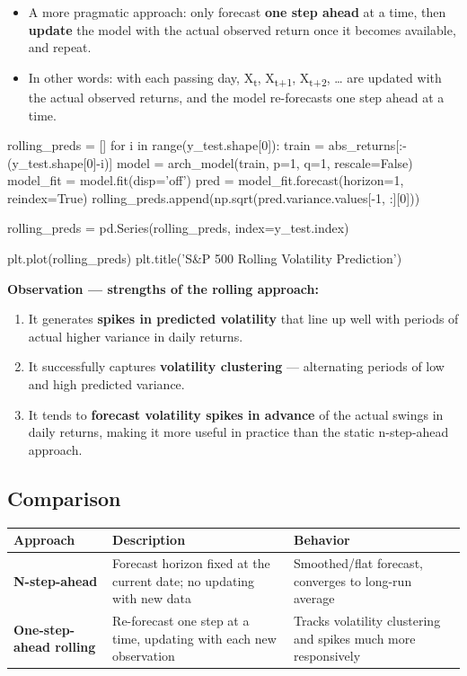 \documentclass[12pt,openany]{book}
\theoremstyle{definition}
\theoremstyle{remark}
\begin{document}
\begin{itemize}
\item A more pragmatic approach: only forecast \textbf{one step ahead} at a time, then \textbf{update} the model with the actual observed return once it becomes available, and repeat.
\item In other words: with each passing day, X\textsubscript{t}, X\textsubscript{t}\textsubscript{+}\textsubscript{1}, X\textsubscript{t}\textsubscript{+}\textsubscript{2}, … are updated with the actual observed returns, and the model re-forecasts one step ahead at a time.
\end{itemize}

\begin{python}
rolling_preds = []
for i in range(y_test.shape[0]):
    train = abs_returns[:-(y_test.shape[0]-i)]
    model = arch_model(train, p=1, q=1, rescale=False)
    model_fit = model.fit(disp='off')
    pred = model_fit.forecast(horizon=1, reindex=True)
    rolling_preds.append(np.sqrt(pred.variance.values[-1, :][0]))

rolling_preds = pd.Series(rolling_preds, index=y_test.index)

plt.plot(rolling_preds)
plt.title('S&P 500 Rolling Volatility Prediction')
\end{python}

\textbf{Observation — strengths of the rolling approach:}
\begin{enumerate}
\item It generates \textbf{spikes in predicted volatility} that line up well with periods of actual higher variance in daily returns.
\item It successfully captures \textbf{volatility clustering} — alternating periods of low and high predicted variance.
\item It tends to \textbf{forecast volatility spikes in advance} of the actual swings in daily returns, making it more useful in practice than the static n-step-ahead approach.
\end{enumerate}

\subsection{Comparison}

{\small
\begin{longtable}{@{}L{0.18\textwidth}L{0.34\textwidth}L{0.38\textwidth}@{}}
\toprule
\textbf{Approach} & \textbf{Description} & \textbf{Behavior} \\
\midrule
\textbf{N-step-ahead} & Forecast horizon fixed at the current date; no updating with new data & Smoothed/flat forecast, converges to long-run average \\
\textbf{One-step-ahead rolling} & Re-forecast one step at a time, updating with each new observation & Tracks volatility clustering and spikes much more responsively \\
\bottomrule
\end{longtable}
}
\end{document}
